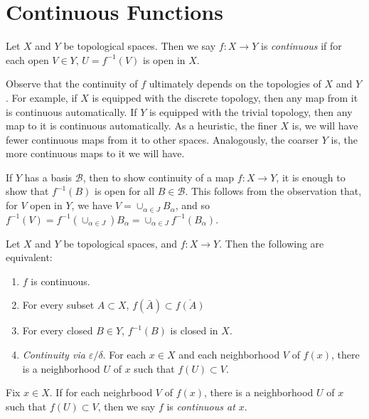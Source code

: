 \section{Continuous Functions}
\begin{definition}
\label{def:cont-fnc}
Let \(X\) and \(Y\) be topological spaces. Then we say
\(f: X \to Y\) is \emph{continuous} if for each open \(V \in Y\),
\(U = f^{-1}(V)\) is open in \(X\).
\end{definition}
\begin{remark}
Observe that the continuity of \(f\) ultimately depends on the topologies of
\(X\) and \(Y\). For example, if \(X\) is equipped with the discrete topology,
then any map from it is continuous automatically. If \(Y\) is equipped with
the trivial topology, then any map to it is continuous automatically.  As a
heuristic, the finer \(X\) is, we will have fewer continuous maps from it to
other spaces. Analogously, the coarser \(Y\) is, the more continuous maps to
it we will have.
\end{remark}
If \(Y\) has a basis \(\mathcal{B}\), then to show continuity of a map
\(f: X \to Y\), it is enough to show that \(f^{-1}(B)\) is open for all
\(B \in \mathcal{B}\). This follows from the observation that, for \(V\) open in
\(Y\), we have \(V = \cup_{\alpha \in J} B_{\alpha}\),
and so \(f^{-1}(V) = f^{-1}(\cup_{\alpha \in J}) B_{\alpha} = \cup_{\alpha \in
J} f^{-1}(B_{\alpha})\).
\begin{theorem}
\label{thm:equiv-cont}
Let \(X\) and \(Y\) be topological spaces, and \(f: X \to Y\). Then the
following are equivalent:
\begin{enumerate}
  \item \(f\) is continuous.
  \item For every subset \(A \subset X\), \(f(\bar{A}) \subset
  \overline{f(A)}\)
  \item For every closed \(B \in Y\), \(f^{-1}(B)\) is closed in \(X\).
  \item{\emph{Continuity via \(\varepsilon/\delta\)}.} For each \(x \in X\) and each neighborhood \(V\) of \(f(x)\), there is
  a neighborhood \(U\) of \(x\) such that \(f(U) \subset V\).
\end{enumerate}
\end{theorem}
\begin{definition}
\label{def:cont-at-a-point}
Fix \(x \in X\). If for each neighrbood \(V\) of \(f(x)\),
there is a neighborhood \(U\) of \(x\) such that
\(f(U) \subset V\), then we say \(f\) is \emph{continuous at \(x\)}.
\end{definition}
